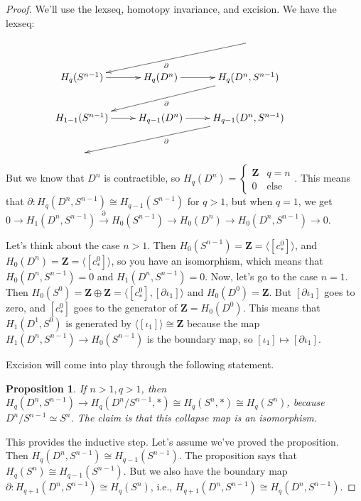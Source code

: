 \documentclass{amsart}
\theoremstyle{theorem}
\newtheorem{prop}[theorem]{Proposition}
\theoremstyle{definition}
\newcommand{\Z}{\mathbf Z}
\begin{document}
\begin{proof}
We'll use the lexseq, homotopy invariance, and excision. We have the lexseq:
\begin{equation*}
\xymatrix{ & & \ar[dll]^\partial\\
 H_q(S^{n-1})\ar[r] & H_q(D^n)\ar[r] & H_q(D^n,S^{n-1})\ar[dll]^\partial\\
 H_{1-1}(S^{n-1})\ar[r] & H_{q-1}(D^n)\ar[r] & H_{q-1}(D^n,S^{n-1})\ar[dll]^\partial\\
 & & &}
\end{equation*}
But we know that $D^n$ is contractible, so $ H_q(D^n)=\begin{cases}\Z & q=n\\ 0 & \text{else}\end{cases}$. This means that $\partial: H_q(D^n,S^{n-1})\cong H_{q-1}(S^{n-1})$ for $q>1$, but when $q=1$, we get $0\to H_1(D^n,S^{n-1})\xrightarrow{\partial} H_0(S^{n-1})\to H_0(D^n) \to H_0(D^n,S^{n-1})\to 0$.

Let's think about the case $n>1$. Then $ H_0(S^{n-1})=\mathbf{Z}=\langle[c^0_\ast]\rangle$, and $ H_0(D^n)=\Z=\langle[c^0_\ast]\rangle$, so you have an isomorphism, which means that $ H_0(D^n,S^{n-1})=0$ and $ H_1(D^n,S^{n-1})=0$. Now, let's go to the case $n=1$. Then $ H_0(S^0)=\Z\oplus\Z=\langle [c^0_\ast],[\partial\iota_1]\rangle$ and $ H_0(D^0)=\Z$. But $[\partial\iota_1]$ goes to zero, and $[c^0_\ast]$ goes to the generator of $\Z= H_0(D^0)$. This means that $ H_1(D^1,S^0)$ is generated by $\langle[\iota_1]\rangle\cong\Z$ because the map $ H_1(D^n,S^{n-1})\to H_0(S^{n-1})$ is the boundary map, so $[\iota_1]\mapsto [\partial\iota_1]$.

Excision will come into play through the following statement.
\begin{prop}
If $n>1,q>1$, then $ H_q(D^n,S^{n-1})\to H_q(D^n/S^{n-1},\ast)\cong H_q(S^n,\ast)\cong H_q(S^n)$, because $D^n/S^{n-1}\simeq S^n$. The claim is that this collapse map is an isomorphism.
\end{prop}
This provides the inductive step. Let's assume we've proved the proposition. Then $ H_q(D^n,S^{n-1})\cong H_{q-1}(S^{n-1})$. The proposition says that $ H_q(S^n)\cong H_{q-1}(S^{n-1})$. But we also have the boundary map $\partial: H_{q+1}(D^n,S^{n-1})\cong H_q(S^n)$, i.e., $ H_{q+1}(D^n,S^{n-1})\cong H_q(D^n,S^{n-1})$.


\end{proof}
\end{document}
